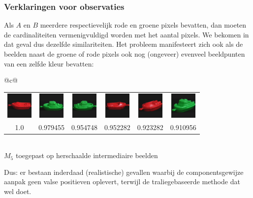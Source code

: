 \documentclass[dutch]{beamer}
\theoremstyle{definition}
\theoremstyle{remark}
\theoremstyle{example}
\begin{document}
{
  \frametitle{Verklaringen voor observaties}
  
  Als $A$ en $B$ meerdere respectievelijk rode en groene pixels bevatten, dan moeten 
  de cardinaliteiten vermenigvuldigd worden met het aantal pixels. 
  We bekomen in dat geval dus dezelfde similariteiten. Het probleem
  manifesteert zich ook als de beelden naast de groene of rode pixels ook nog 
  (ongeveer) evenveel beeldpunten van een zelfde kleur bevatten:
  \begin{center}
  \begin{tabular}{@{}c@{}}
  \begin{minipage}{\textwidth}
  \centering
  \begin{tabular}{cccccc}
  \includegraphics[width=1.3cm]{coil/beeld-18.eps} & 
  \includegraphics[width=1.3cm]{coil/beeld-54.eps} &
  \includegraphics[width=1.3cm]{coil/beeld-55.eps} &
  \includegraphics[width=1.3cm]{coil/beeld-19.eps} &
  \includegraphics[width=1.3cm]{coil/beeld-21.eps} &
  \includegraphics[width=1.3cm]{coil/beeld-57.eps} \\
  {\scriptsize 1.0} & 
  {\scriptsize 0.979455} & 
  {\scriptsize 0.954748} & 
  {\scriptsize 0.952282} & 
  {\scriptsize 0.923282} &
  {\scriptsize 0.910956} 
  \end{tabular}
  \end{minipage} \\
  {\scriptsize $M_5$ toegepast op herschaalde intermediaire beelden}
  \end{tabular}
  \end{center}

  Dus: er bestaan inderdaad (realistische) gevallen waarbij de componentsgewijze 
  aanpak geen valse positieven oplevert, terwijl de traliegebaseerde
  methode dat wel doet.
}
\end{document}
